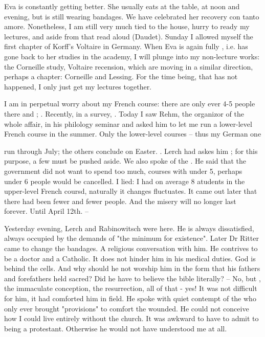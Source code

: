
Eva is constantly getting better. She usually eats at the table,  at noon and evening, but is still wearing bandages. We have celebrated her recovery con tanto amore. Nonetheless, I am still very much tied to the house, hurry to ready my lectures, and aside from that read aloud (Daudet). Sunday I allowed myself the first chapter of Korff's Voltaire in Germany. When Eva is again fully , i.e. has gone back to her studies in the academy, I will plunge into my non-lecture works: the Corneille study, Voltaire recension, which are moving in a similar direction, perhaps a chapter: Corneille and Lessing. For the time being, that has not happened, I only just get my lectures together.

I am in perpetual worry about my French course: there are only ever 4-5 people there and ; . Recently, in a survey, . Today I saw Rehm, the organizor of the whole affair, in his philology seminar and asked him to let me run a lower-level French course in the summer. Only the lower-level courses -- thus my German one 

 run through July; the others conclude on Easter. . Lerch had askes him ; for this purpose, a few  must be pushed aside. We also spoke of the . He said that the government did not want to spend too much, courses with under 5, perhaps under 6 people would be cancelled. I lied: I had on average 8 atudents in the upper-level French coursd, naturally it changes fluctuates. It came out later that there had been fewer and fewer people. And the misery will no longer last forever. Until April 12th. --
 
Yesterday evening, Lerch and Rabinowitsch were here. He is always dissatisfied, always occupied by the demands of "the minimum for existence". Later Dr Ritter came to change the bandages. A religious conversation with him. He contrives to be a doctor and a Catholic. It does not hinder him in his medical duties. God is behind the cells. And why should he not worship him in the form that his fathers and forefathers held sacred? Did he have to believe the bible literally? -- No, but , the immaculate conception, the resurrection, all of that - yes! It was not difficult for him, it had comforted him in field. He spoke with quiet contempt of the  who only ever brought "provisions" to comfort the wounded. He could not conceive how I could live entirely without the church. It was awkward to have to admit to being a protestant. Otherwise he would not have understood me at all.

